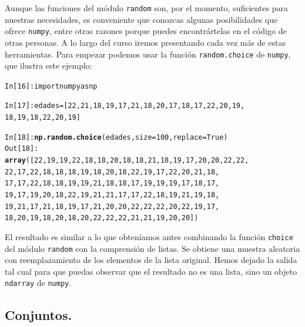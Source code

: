 \documentclass[10pt,a4paper]{article}\usepackage[]{graphicx}\usepackage[]{color}
\makeatletter
\newcommand{\hlkwd}[1]{\textcolor[rgb]{0.737,0.353,0.396}{\textbf{#1}}}%
\newenvironment{kframe}{%
 \def\at@end@of@kframe{}%
 \ifinner\ifhmode%
  \def\at@end@of@kframe{\end{minipage}}%
  \begin{minipage}{\columnwidth}%
 \fi\fi%
 \def\FrameCommand##1{\hskip\@totalleftmargin \hskip-\fboxsep
 \colorbox{shadecolor}{##1}\hskip-\fboxsep
     \hskip-\linewidth \hskip-\@totalleftmargin \hskip\columnwidth}%
 \MakeFramed {\advance\hsize-\width
   \@totalleftmargin\z@ \linewidth\hsize
   \@setminipage}}%
 {\par\unskip\endMakeFramed%
 \at@end@of@kframe}
\newenvironment{knitrout}{}{} %
\newcounter {cont01}
\makeatother
\begin{document}
Aunque las funciones del módulo {\tt random} son, por el momento, suficientes para nuestras necesidades, es conveniente que conozcas algunas posibilidades que ofrece {\tt numpy}, entre otras razones porque puedes encontrártelas en el código de otras personas. A lo largo del curso iremos presentando cada vez más de estas herramientas. Para empezar podemos usar la función {\tt random.choice} de {\tt numpy}, que ilustra este ejemplo:
\begin{knitrout}
\color{fgcolor}\begin{kframe}
\begin{alltt}
In [16]: import numpy as np

In [17]: edades = [22, 21, 18, 19, 17, 21, 18, 20, 17, 18, 17, 22, 20, 19,
18, 19, 18, 22, 20, 19]

In [18]: \hlkwd{np.random.choice}(edades, size=100, replace=True)
Out[18]:
\hlkwd{array}([22, 19, 19, 22, 18, 18, 20, 18, 18, 21, 18, 19, 17, 20, 20, 22, 22,
       22, 17, 22, 18, 18, 18, 19, 18, 20, 18, 22, 19, 17, 22, 20, 21, 18,
       17, 17, 22, 18, 18, 19, 19, 21, 18, 18, 17, 19, 19, 19, 17, 18, 17,
       19, 17, 19, 20, 18, 22, 19, 21, 21, 17, 17, 22, 18, 19, 21, 19, 18,
       19, 21, 17, 21, 18, 19, 17, 21, 20, 20, 22, 22, 22, 20, 22, 19, 17,
       18, 20, 19, 18, 20, 18, 20, 22, 22, 22, 21, 21, 19, 20, 20])
\end{alltt}
\end{kframe}
\end{knitrout}
El resultado es similar a lo que obteníamos antes combinando la función {\tt choice} del módulo {\tt random} con la comprensión de listas. Se obtiene una muestra aleatoria con reemplazamiento de los elementos de la lista original. Hemos dejado la salida tal cual para que puedas observar que el resultado no es una lista, sino un objeto {\tt ndarray} de {\tt numpy}.

\subsection{Conjuntos.}
\label{tut02:subsec:conjuntos}
\end{document}
